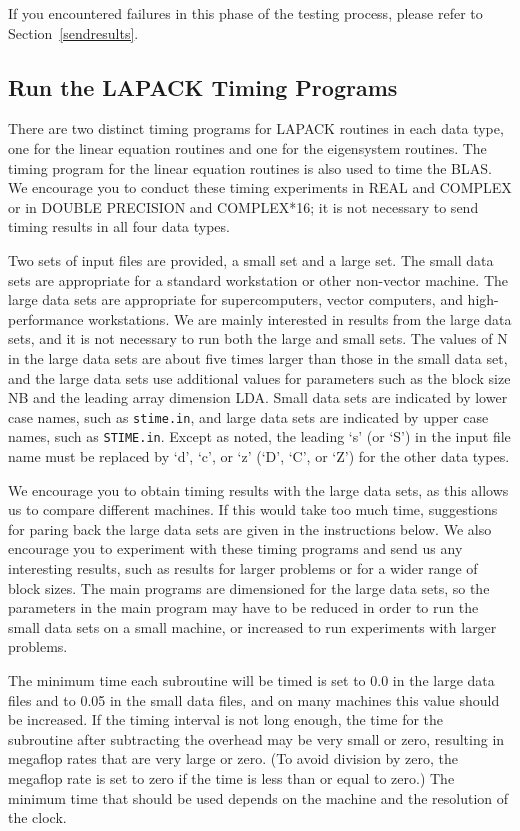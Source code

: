 If you encountered failures in this phase of the testing process, please
refer to Section~\ref{sendresults}.

\subsection{Run the LAPACK Timing Programs}

\dent
There are two distinct timing programs for LAPACK routines
in each data type, one for the linear equation routines and
one for the eigensystem routines.  The timing program for the
linear equation routines is also used to time the BLAS.
We encourage you to conduct these timing experiments
in REAL and COMPLEX or in DOUBLE PRECISION and COMPLEX*16; it is
not necessary to send timing results in all four data types.

Two sets of input files are provided, a small set and a large set.
The small data sets are appropriate for a standard workstation or
other non-vector machine.
The large data sets are appropriate for supercomputers, vector
computers, and high-performance workstations.
We are mainly interested in results from the large data sets, and
it is not necessary to run both the large and small sets.
The values of N in the large data sets are about five times larger
than those in the small data set,
and the large data sets use additional values for parameters such as the
block size NB and the leading array dimension LDA.
Small data sets are indicated by lower case names, such as
{\tt stime.in}, and large data sets are indicated by upper case names,
such as {\tt STIME.in}.
Except as noted, the leading `s' (or `S') in the input file name must be
replaced by `d', `c', or `z' (`D', `C', or `Z') for the other data types.

We encourage you to obtain timing results with the large data sets,
as this allows us to compare different machines.
If this would take too much time, suggestions for paring back the large
data sets are given in the instructions below.
We also encourage you to experiment with these timing
programs and send us any interesting results, such as results for
larger problems or for a wider range of block sizes.
The main programs are dimensioned for the large data sets,
so the parameters in the main program may have to be reduced in order
to run the small data sets on a small machine, or increased to run
experiments with larger problems.

The minimum time each subroutine will be timed is set to 0.0 in
the large data files and to 0.05 in the small data files, and on
many machines this value should be increased.
If the timing interval is not long
enough, the time for the subroutine after subtracting the overhead
may be very small or zero, resulting in megaflop rates that are
very large or zero. (To avoid division by zero, the megaflop rate is
set to zero if the time is less than or equal to zero.)
The minimum time that should be used depends on the machine and the
resolution of the clock.

